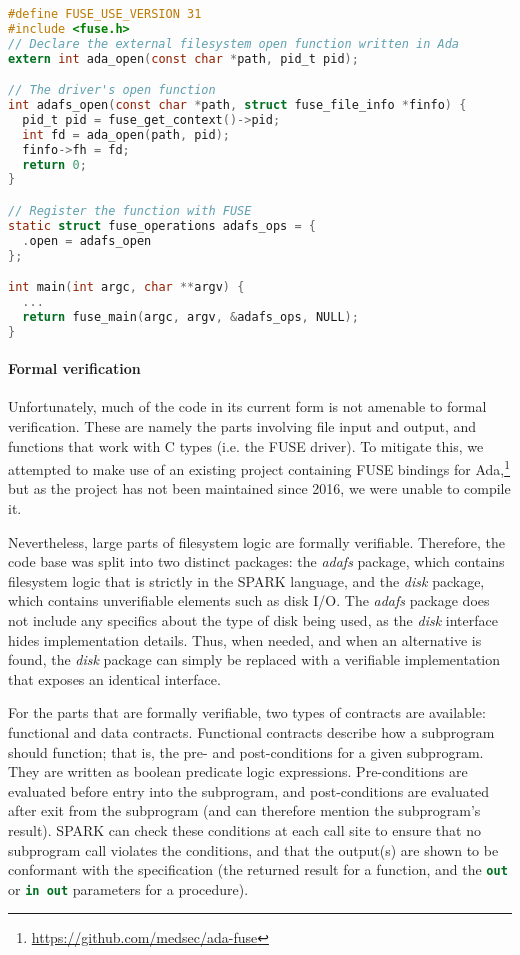 \begin{lstlisting}[float=tb,caption={FUSE driver implementation of \textnormal{open}}, label={code:fuse open}, language=C]
#define FUSE_USE_VERSION 31
#include <fuse.h>
// Declare the external filesystem open function written in Ada
extern int ada_open(const char *path, pid_t pid);

// The driver's open function
int adafs_open(const char *path, struct fuse_file_info *finfo) {
  pid_t pid = fuse_get_context()->pid;
  int fd = ada_open(path, pid);
  finfo->fh = fd;
  return 0;
}

// Register the function with FUSE
static struct fuse_operations adafs_ops = {
  .open = adafs_open
};

int main(int argc, char **argv) {
  ...
  return fuse_main(argc, argv, &adafs_ops, NULL);
}
\end{lstlisting}

\paragraph{Formal verification}
Unfortunately, much of the code in its current form is not amenable to formal verification.
These are namely the parts involving file input and output, and functions that work with C types (i.e. the FUSE driver).
To mitigate this, we attempted to make use of an existing project containing FUSE bindings for Ada,\footnote{\url{https://github.com/medsec/ada-fuse}} but as the project has not been maintained since 2016, we were unable to compile it.

Nevertheless, large parts of filesystem logic are formally verifiable.
Therefore, the code base was split into two distinct packages: the \textit{adafs} package, which contains filesystem logic that is strictly in the SPARK language, and the \textit{disk} package, which contains unverifiable elements such as disk I/O.
The \textit{adafs} package does not include any specifics about the type of disk being used, as the \textit{disk} interface hides implementation details.
Thus, when needed, and when an alternative is found, the \textit{disk} package can simply be replaced with a verifiable implementation that exposes an identical interface.

For the parts that are formally verifiable, two types of contracts are available: functional and data contracts.
Functional contracts describe how a subprogram should function; that is, the pre- and post-conditions for a given subprogram.
They are written as boolean predicate logic expressions.
Pre-conditions are evaluated before entry into the subprogram, and post-conditions are evaluated after exit from the subprogram (and can therefore mention the subprogram's result).
SPARK can check these conditions at each call site to ensure that no subprogram call violates the conditions, and that the output(s) are shown to be conformant with the specification (the returned result for a function, and the \lstinline[language=Ada]{out} or \lstinline[language=Ada]{in out} parameters for a procedure).

